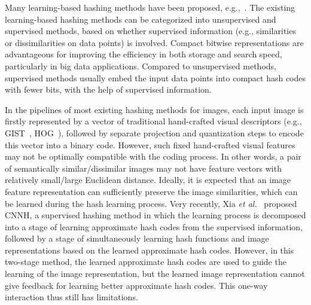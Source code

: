 \documentclass[10pt,twocolumn,letterpaper]{article}
\begin{document}
 Many learning-based hashing methods have been proposed, e.g.,~\cite{BRE,KLSH,ITQ,KSH,MLH,CNNH,liu2013hash,wang2012semi,gong2013learning}.
The existing learning-based hashing methods can be categorized into
unsupervised and supervised methods, based on whether supervised
information (e.g., similarities or dissimilarities on data points)
is involved. Compact bitwise representations are advantageous for
improving the efficiency in both storage and search speed,
particularly in big data applications. Compared to unsupervised
methods, supervised methods usually embed the input data points into
compact hash codes with fewer bits, with the help of supervised
information.

In the pipelines of most existing hashing methods for images, each
input image is firstly represented by a vector of traditional
hand-crafted visual descriptors (e.g., GIST~\cite{GIST},
HOG~\cite{HOG}), followed by separate projection and quantization steps to
encode this vector into a binary code. However, such fixed
hand-crafted visual features  may not be optimally compatible with the coding process. In other words, a pair of
semantically similar/dissimilar images may not have feature vectors
with relatively small/large Euclidean distance. Ideally, it is expected that an image feature representation can sufficiently
preserve the image similarities, which can be learned during the
hash learning process. Very recently, Xia \textit{et
al.}~\cite{CNNH} proposed CNNH, a supervised hashing method in which
the learning process is decomposed into a stage of learning
approximate hash codes from the supervised information, followed by
a stage of simultaneously learning hash functions and image
representations based on the learned approximate hash codes.
However, in this two-stage method, the learned approximate hash
codes are used to guide the learning of the image representation,
but the learned image representation cannot give feedback for learning
better approximate hash codes. This one-way interaction thus still has limitations.
\end{document}
